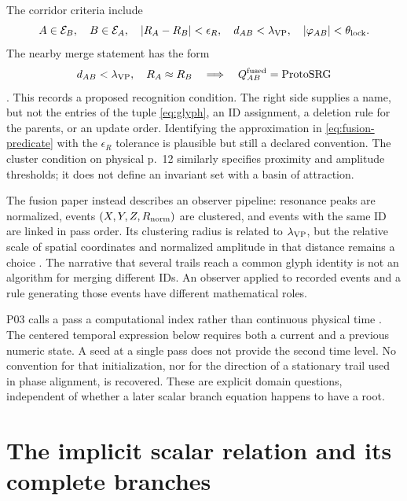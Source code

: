 \documentclass[11pt,a4paper]{article}
\theoremstyle{definition}
\numberwithin{equation}{section}
\begin{document}
The corridor criteria include
\begin{equation}
 A\in\mathcal E_B,\quad B\in\mathcal E_A,\quad
 |R_A-R_B|<\epsilon_R,\quad d_{AB}<\lambda_{\rm VP},\quad
 |\varphi_{AB}|<\theta_{\rm lock}.
 \label{eq:corridor}
\end{equation}
The nearby merge statement has the form
\begin{equation}
 d_{AB}<\lambda_{\rm VP},\quad R_A\approx R_B
 \quad\Longrightarrow\quad Q^{\rm fused}_{AB}=\mathrm{ProtoSRG}
 \label{eq:fusion-predicate}
\end{equation}
\cite[physical p.~10, \S\S4.1--4.3]{P03}.
This records a proposed recognition condition. The right side supplies a
name, but not the entries of the tuple \eqref{eq:glyph}, an ID assignment,
a deletion rule for the parents, or an update order. Identifying the
approximation in \eqref{eq:fusion-predicate} with the $\epsilon_R$ tolerance
is plausible but still a declared convention. The cluster condition on
physical p.~12 similarly specifies proximity and amplitude thresholds; it
does not define an invariant set with a basin of attraction.

The fusion paper instead describes an observer pipeline: resonance peaks
are normalized, events $(X,Y,Z,R_{\rm norm})$ are clustered, and events with
the same ID are linked in pass order. Its clustering radius is related to
$\lambda_{\rm VP}$, but the relative scale of spatial coordinates and
normalized amplitude in that distance remains a choice
\cite[physical pp.~5--7, \S\S3.2--3.5]{P01}.
The narrative that several trails reach a common glyph identity is not
an algorithm for merging different IDs. An observer applied to recorded
events and a rule generating those events have different mathematical roles.

P03 calls a pass a computational index rather than continuous physical
time \cite[physical p.~7, \S3.1]{P03}.
The centered temporal expression below requires both a current and a
previous numeric state. A seed at a single pass does not provide the
second time level. No convention for that initialization, nor for the
direction of a stationary trail used in phase alignment, is recovered.
These are explicit domain questions, independent of whether a later
scalar branch equation happens to have a root.


\section{The implicit scalar relation and its complete branches}\label{sec:implicit}
\end{document}
